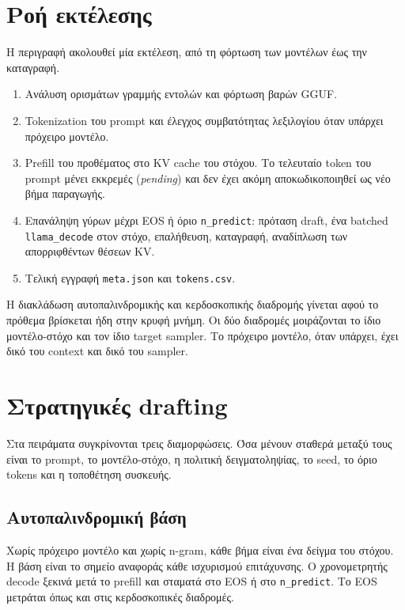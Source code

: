 \documentclass[a4paper,12pt]{report}
\theoremstyle{plain}
\theoremstyle{definition}
\theoremstyle{remark}
\begin{document}
\section{Ροή εκτέλεσης}
\label{sec:architecture}

Η περιγραφή ακολουθεί μία εκτέλεση, από τη φόρτωση των μοντέλων έως την
καταγραφή.

\begin{enumerate}[leftmargin=*]
  \item Ανάλυση ορισμάτων γραμμής εντολών και φόρτωση βαρών GGUF.
  \item Tokenization του prompt και έλεγχος συμβατότητας λεξιλογίου όταν υπάρχει
    πρόχειρο μοντέλο.
  \item Prefill του προθέματος στο KV cache του στόχου. Το τελευταίο token του
    prompt μένει εκκρεμές (\emph{pending}) και δεν έχει ακόμη
    αποκωδικοποιηθεί ως νέο βήμα
    παραγωγής.
  \item Επανάληψη γύρων μέχρι EOS ή όριο \texttt{n\_predict}: πρόταση draft, ένα
    batched \texttt{llama\_decode} στον στόχο, επαλήθευση, καταγραφή, αναδίπλωση
    των απορριφθέντων θέσεων KV.
  \item Τελική εγγραφή \texttt{meta.json} και \texttt{tokens.csv}.
\end{enumerate}

Η διακλάδωση αυτοπαλινδρομικής και κερδοσκοπικής διαδρομής γίνεται αφού το
πρόθεμα βρίσκεται ήδη στην κρυφή μνήμη. Οι δύο διαδρομές μοιράζονται το ίδιο
μοντέλο-στόχο και τον ίδιο target sampler. Το πρόχειρο μοντέλο, όταν υπάρχει,
έχει δικό του context και δικό του sampler.

\section{Στρατηγικές drafting}
\label{sec:strategies}

Στα πειράματα συγκρίνονται τρεις διαμορφώσεις. Όσα μένουν σταθερά μεταξύ τους
είναι το prompt, το μοντέλο-στόχο, η πολιτική δειγματοληψίας, το seed, το όριο
tokens και η τοποθέτηση συσκευής.

\subsection{Αυτοπαλινδρομική βάση}

Χωρίς πρόχειρο μοντέλο και χωρίς n-gram, κάθε βήμα είναι ένα δείγμα του
στόχου. Η βάση είναι το σημείο αναφοράς κάθε ισχυρισμού επιτάχυνσης. Ο
χρονομετρητής decode ξεκινά μετά το prefill και σταματά στο EOS ή στο
\texttt{n\_predict}.
Το EOS μετράται όπως και στις κερδοσκοπικές διαδρομές.
\end{document}

